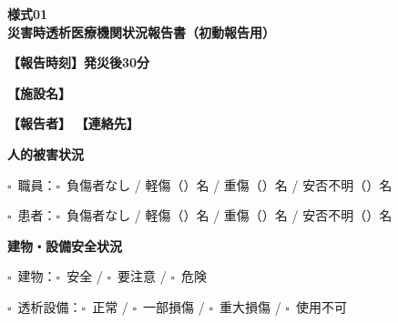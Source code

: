 \documentclass[a4paper,12pt]{jarticle}
\newcommand{\checkbox}{$\square$\ }
\newcommand{\underlinespace}[1]{\underline{\hspace{#1}}}
\begin{document}
\begin{center}
{\Large\textbf{様式01}}\\
\vspace{3mm}
{\Large\textbf{災害時透析医療機関状況報告書（初動報告用）}}
\end{center}
\vspace{5mm}

\noindent
\textbf{【報告時刻】発災後30分}

\vspace{5mm}

\noindent
\textbf{【施設名】} \underlinespace{10cm}

\vspace{3mm}

\noindent
\textbf{【報告者】} \underlinespace{4cm} \quad \textbf{【連絡先】} \underlinespace{5cm}

\vspace{8mm}

\begin{center}
\textbf{\large 人的被害状況}
\end{center}

\vspace{3mm}

\noindent
\checkbox 職員：\quad \checkbox 負傷者なし \quad / \quad 軽傷（\underlinespace{1cm}）名 \quad / \quad 重傷（\underlinespace{1cm}）名 \quad / \quad 安否不明（\underlinespace{1cm}）名

\vspace{3mm}

\noindent
\checkbox 患者：\quad \checkbox 負傷者なし \quad / \quad 軽傷（\underlinespace{1cm}）名 \quad / \quad 重傷（\underlinespace{1cm}）名 \quad / \quad 安否不明（\underlinespace{1cm}）名

\vspace{8mm}

\begin{center}
\textbf{\large 建物・設備安全状況}
\end{center}

\vspace{3mm}

\noindent
\checkbox 建物：\quad \checkbox 安全 \quad / \quad \checkbox 要注意 \quad / \quad \checkbox 危険

\vspace{3mm}

\noindent
\checkbox 透析設備：\quad \checkbox 正常 \quad / \quad \checkbox 一部損傷 \quad / \quad \checkbox 重大損傷 \quad / \quad \checkbox 使用不可
\end{document}
